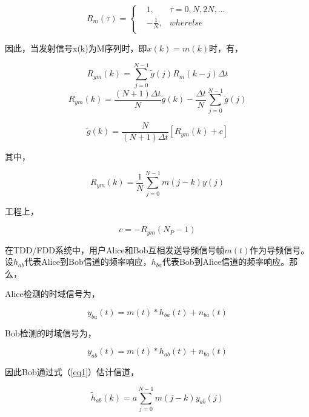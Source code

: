 \documentclass[master]{seuthesis} %
\begin{document}
\begin{Main}
\begin{equation} \label{m_self}
    R_m(\tau) = \left\{
  \begin{aligned}
  &1, &\tau = 0, N, 2N, ... \\
  &-\frac{1}{N}, &wherelse \\
  \end{aligned}
  \right.
\end{equation}

因此，当发射信号x(k)为M序列时，即$x(k) = m(k)$时，有，

\begin{equation}
    R_{ym}(k) = \sum_{j=0}^{N-1} \tilde{g}(j)R_m(k-j)\Delta t
\end{equation}
\begin{equation}
    R_{ym}(k) = \frac{(N+1)\Delta t}{N} \tilde{g}(k) - \frac{\Delta t}{N} \sum_{j=0}^{N-1} \tilde{g}(j)
\end{equation}
  
\begin{equation}\label{eq1}
    \tilde{g}(k) = \frac{N}{(N+1)\Delta t} [R_{ym}(k) + c]
\end{equation}

其中，

\begin{equation}
  R_{ym}(k) = \frac{1}{N}\sum_{j=0}^{N-1}m(j-k)y(j)
\end{equation}

工程上，

\begin{equation}
  c=-R_{ym}(N_P - 1)
\end{equation}
  
在TDD/FDD系统中，用户Alice和Bob互相发送导频信号帧$m(t)$作为导频信号。设$h_{ab}$代表Alice到Bob信道的频率响应，$h_{ba}$代表Bob到Alice信道的频率响应。那么，

Alice检测的时域信号为，

\begin{equation}
    y_{ba}(t) = m(t) * h_{ba}(t) + n_{ba}(t) 
\end{equation}

Bob检测的时域信号为，

\begin{equation}
    y_{ab}(t) = m(t) * h_{ab}(t) + n_{ba}(t)    
\end{equation}

因此Bob通过式（\ref{eq1}）估计信道，

\begin{equation}
    \tilde{h}_{ab}(k) = a\sum_{j=0}^{N-1}m(j-k)y_{ab}(j)
\end{equation}
  

\end{Main}
\end{document}
